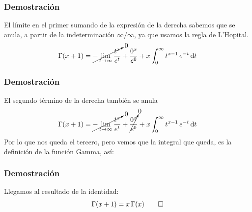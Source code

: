 \documentclass[12pt]{beamer}
\begin{document}
\begin{frame}
\frametitle{Demostración}
El límite en el primer sumando de la expresión de la derecha sabemos que se anula, a partir de la indeterminación $\infty / \infty$, ya que usamos la regla de L'Hopital.
\pause
\begin{align*}
\Gamma (x + 1) = \cancelto{0}{- \lim_{t \to \infty} \dfrac{t^{x}}{e^t}} + \dfrac{0^{x}}{e^{0}} + x \int_{0}^{\infty} t^{x-1} \, e^{-t} \dd{t}
\end{align*}
\end{frame}
\begin{frame}
\frametitle{Demostración}
El segundo término de la derecha también se anula
\begin{align*}
\Gamma (x + 1) = \cancelto{0}{- \lim_{t \to \infty} \dfrac{t^{x}}{e^t}} + \cancelto{0}{\dfrac{0^{x}}{e^{0}}} + x \int_{0}^{\infty} t^{x-1} \, e^{-t} \dd{t}
\end{align*}
\pause
Por lo que nos queda el tercero, pero vemos que la integral que queda, es la definición de la función Gamma, así:
\end{frame}
\begin{frame}
\frametitle{Demostración}
Llegamos al resultado de la identidad:
\begin{align}
\Gamma (x + 1) = x \, \Gamma (x) \qed
\label{eq:ecuacion_01_04_01}
\end{align}
\end{frame}
\end{document}
